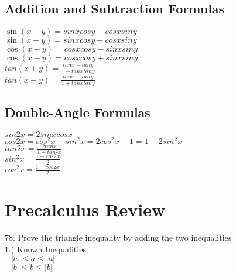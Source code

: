 \documentclass{article}
\begin{document}
	\subsection*{Addition and Subtraction Formulas}
		\begin{center}
		$\sin(x + y) = sinxcosy + cosxsiny$\\
		\vspace{10pt}
		$\sin(x - y) = sinxcosy - cosxsiny$\\
		\vspace{10pt}
		$\cos(x + y) = cosxcosy - sinxsiny$\\
		\vspace{10pt}
		$\cos(x - y) = cosxcosy + sinxsiny$\\
		\vspace{10pt}
		$tan(x + y) = \frac{tanx + tany}{1 - tanxtany}$\\
		\vspace{10pt}
		$tan(x - y) = \frac{tanx - tany}{1 + tanxtany}$
		\end{center}
	\subsection*{Double-Angle Formulas}
		\begin{center}
		$sin2x = 2sinxcosx$\\
		\vspace{10pt}
		$cos2x = cos^2x - sin^2x = 2cos^2x-1 = 1-2sin^2x$\\
		\vspace{10pt}
		$tan2x = \frac{2tanx}{1 - tan^2x}$\\
		\vspace{10pt}
		$sin^2x = \frac{1 - cos2x}{2}$\\
		\vspace{10pt}
		$cos^2x = \frac{1+cos2x}{2}$
		\end{center}

\section* {Precalculus Review}

78. Prove the triangle inequality by adding the two inequalities\\

1.) Known Inequalities\\
\indent$-\left|a\right| \leq a \leq \left|a\right|$\\
\indent$-\left|b\right| \leq b \leq \left|b\right|$\\
\end{document}
